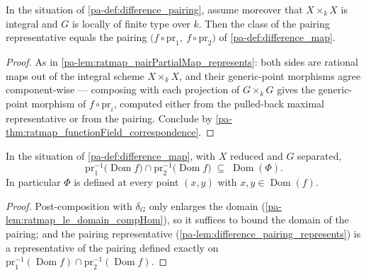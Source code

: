 \begin{lemma}
  \label{pa-lem:difference_pairing_represents}
  \leanok

  In the situation of \ref{pa-def:difference_pairing}, assume moreover that
  \(X \times_k X\) is integral and \(G\) is locally of finite type over \(k\).
  Then the class of the pairing representative equals the pairing
  \(\bigl(f \circ \mathrm{pr}_1,\ f \circ \mathrm{pr}_2\bigr)\) of
  \ref{pa-def:difference_map}.
\end{lemma}
\begin{proof}
  \leanok
  As in \ref{pa-lem:ratmap_pairPartialMap_represents}: both sides are rational maps
  out of the integral scheme \(X \times_k X\), and their generic-point morphisms
  agree component-wise --- composing with each projection of \(G \times_k G\)
  gives the generic-point morphism of \(f \circ \mathrm{pr}_i\), computed either
  from the pulled-back maximal representative or from the pairing. Conclude by
  \ref{pa-thm:ratmap_functionField_correspondence}.
\end{proof}

\begin{theorem}
  \label{pa-thm:difference_map_domain}
  \leanok

  In the situation of \ref{pa-def:difference_map}, with \(X\) reduced and \(G\)
  separated,
  \[
    \mathrm{pr}_1^{-1}\bigl(\operatorname{Dom} f\bigr) \cap
    \mathrm{pr}_2^{-1}\bigl(\operatorname{Dom} f\bigr)
    \;\subseteq\;
    \operatorname{Dom}(\Phi).
  \]
  In particular \(\Phi\) is defined at every point \((x, y)\) with
  \(x, y \in \operatorname{Dom}(f)\).
\end{theorem}
\begin{proof}
  \leanok
  Post-composition with \(\delta_G\) only enlarges the domain
  (\ref{pa-lem:ratmap_le_domain_compHom}), so it suffices to bound the domain of
  the pairing; and the pairing representative
  (\ref{pa-lem:difference_pairing_represents}) is a representative of the pairing
  defined exactly on
  \(\mathrm{pr}_1^{-1}(\operatorname{Dom} f) \cap
  \mathrm{pr}_2^{-1}(\operatorname{Dom} f)\).
\end{proof}

